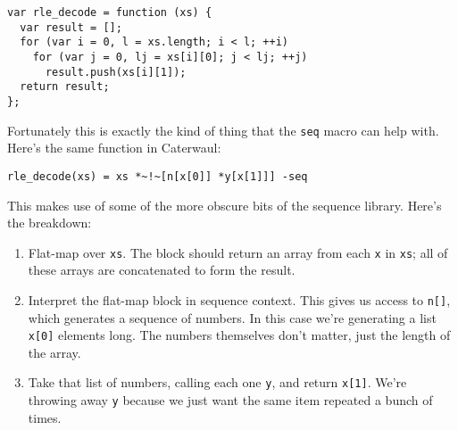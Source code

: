 \documentclass{report}
\begin{document}
\begin{verbatim}
var rle_decode = function (xs) {
  var result = [];
  for (var i = 0, l = xs.length; i < l; ++i)
    for (var j = 0, lj = xs[i][0]; j < lj; ++j)
      result.push(xs[i][1]);
  return result;
};
\end{verbatim}

  Fortunately this is exactly the kind of thing that the \verb+seq+ macro can help with. Here's the same function in Caterwaul:

\begin{verbatim}
rle_decode(xs) = xs *~!~[n[x[0]] *y[x[1]]] -seq
\end{verbatim}

  This makes use of some of the more obscure bits of the sequence library. Here's the breakdown:

\begin{enumerate}
\item[{\tt xs *\textasciitilde !}]
  Flat-map over {\tt xs}. The block should return an array from each {\tt x} in {\tt xs}; all of these arrays are concatenated to form the result.

\item[{\tt \textasciitilde[n[x[0]] ...]}]
  Interpret the flat-map block in sequence context. This gives us access to {\tt n[]}, which generates a sequence of numbers. In this case we're generating a list {\tt x[0]} elements long.
  The numbers themselves don't matter, just the length of the array.

\item[{\tt *y[x[1]]}]
  Take that list of numbers, calling each one {\tt y}, and return {\tt x[1]}. We're throwing away {\tt y} because we just want the same item repeated a bunch of times.
\end{enumerate}
\end{document}
